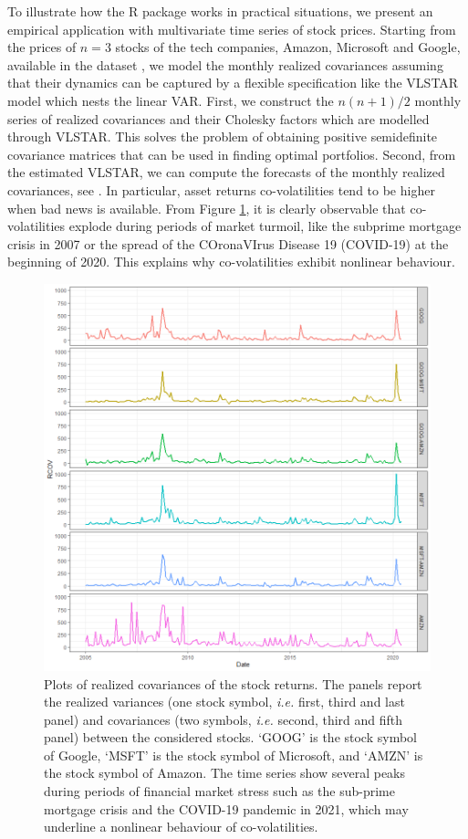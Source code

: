 To illustrate how the R package  works in practical situations, we present an empirical application with multivariate time series of stock prices. Starting from the prices of $n=3$ stocks of the tech companies, Amazon, Microsoft and Google, available in the dataset , we model the monthly realized covariances assuming that their dynamics can be captured by a flexible specification like the VLSTAR model which nests the linear VAR. First, we construct the $n(n+1)/2$ monthly series of realized covariances and their Cholesky factors which are modelled through VLSTAR. This solves the problem of obtaining positive semidefinite covariance matrices that can be used in finding optimal portfolios. Second, from the estimated VLSTAR, we can compute the forecasts of the monthly realized covariances, see \cite{chivo11, buparo19, buc20jf}.
In particular, asset returns co-volatilities tend to be higher when bad news is available. From Figure \ref{fig:Figure0}, it is clearly observable that co-volatilities explode during periods of market turmoil, like the subprime mortgage crisis in 2007 or the spread of the COronaVIrus Disease 19 (COVID-19) at the beginning of 2020. This explains why co-volatilities exhibit nonlinear behaviour.


\begin{figure}[H]
	\centering
	\includegraphics[width = \columnwidth]{Nonlinear}
	\caption{\label{fig:Figure0} Plots of realized covariances of the stock returns. The panels report the realized variances (one stock symbol, \textit{i.e.} first, third and last panel) and covariances (two symbols, \textit{i.e.} second, third and fifth panel) between the considered stocks. `GOOG' is the stock symbol of Google, `MSFT' is the stock symbol of Microsoft, and `AMZN' is the stock symbol of Amazon. The time series show several peaks during periods of financial market stress such as the sub-prime mortgage crisis and the COVID-19 pandemic in 2021, which may underline a nonlinear behaviour of co-volatilities.}
\end{figure}

